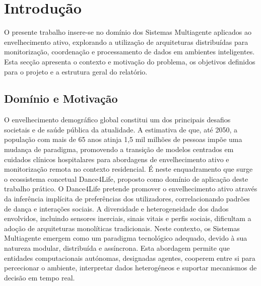 \documentclass[runningheads]{llncs}
\begin{document}
\section{Introdução}
O presente trabalho insere-se no domínio dos Sistemas Multiagente aplicados ao envelhecimento ativo, explorando a utilização de arquiteturas distribuídas para monitorização, coordenação e processamento de dados em ambientes inteligentes. Esta secção apresenta o contexto e motivação do problema, os objetivos definidos para o projeto e a estrutura geral do relatório. 

\subsection{Domínio e Motivação}
O envelhecimento demográfico global constitui um dos principais desafios societais e de saúde pública da atualidade. A estimativa de que, até 2050, a população com mais de 65 anos atinja 1,5 mil milhões de pessoas impõe uma mudança de paradigma, promovendo a transição de modelos centrados em cuidados clínicos hospitalares para abordagens de envelhecimento ativo e monitorização remota no contexto residencial. 
É neste enquadramento que surge o ecossistema concetual Dance4Life, proposto como domínio de aplicação deste trabalho prático. O Dance4Life pretende promover o envelhecimento ativo através da inferência implícita de preferências dos utilizadores, correlacionando padrões de dança e interações sociais. 
A diversidade e heterogeneidade dos dados envolvidos, incluindo sensores inerciais, sinais vitais e perfis sociais, dificultam a adoção de arquiteturas monolíticas tradicionais. Neste contexto, os Sistemas Multiagente emergem como um paradigma tecnológico adequado, devido à sua natureza modular, distribuída e assíncrona. Esta abordagem permite que entidades computacionais autónomas, designadas agentes, cooperem entre si para percecionar o ambiente, interpretar dados heterogéneos e suportar mecanismos de decisão em tempo real.
\end{document}
